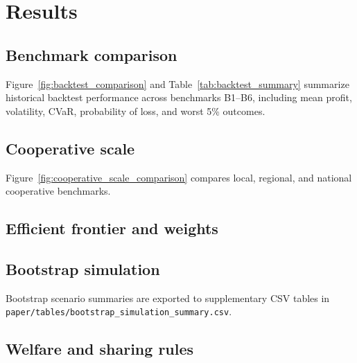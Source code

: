 \section{Results}
\label{sec:results}

\subsection{Benchmark comparison}

Figure~\ref{fig:backtest_comparison} and Table~\ref{tab:backtest_summary} summarize
historical backtest performance across benchmarks B1--B6, including mean profit, volatility,
CVaR, probability of loss, and worst 5\% outcomes.


\subsection{Cooperative scale}

Figure~\ref{fig:cooperative_scale_comparison} compares local, regional, and national
cooperative benchmarks.


\subsection{Efficient frontier and weights}


\subsection{Bootstrap simulation}

Bootstrap scenario summaries are exported to supplementary CSV tables in
\texttt{paper/tables/bootstrap\_simulation\_summary.csv}.

\subsection{Welfare and sharing rules}

